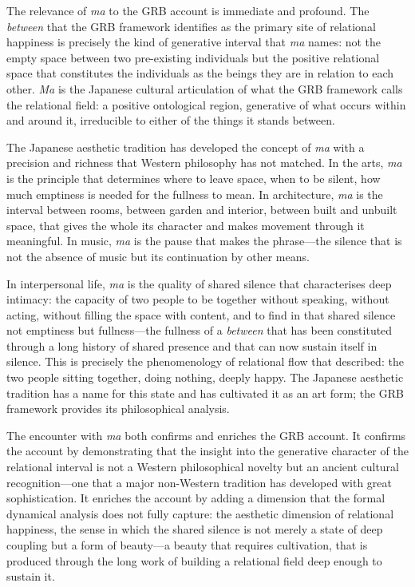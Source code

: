 The relevance of \emph{ma} to the GRB account is immediate and profound. The \emph{between} that the GRB framework identifies as the primary site of relational happiness is precisely the kind of generative interval that \emph{ma} names: not the empty space between two pre-existing individuals but the positive relational space that constitutes the individuals as the beings they are in relation to each other. \emph{Ma} is the Japanese cultural articulation of what the GRB framework calls the relational field: a positive ontological region, generative of what occurs within and around it, irreducible to either of the things it stands between.

The Japanese aesthetic tradition has developed the concept of \emph{ma} with a precision and richness that Western philosophy has not matched. In the arts, \emph{ma} is the principle that determines where to leave space, when to be silent, how much emptiness is needed for the fullness to mean. In architecture, \emph{ma} is the interval between rooms, between garden and interior, between built and unbuilt space, that gives the whole its character and makes movement through it meaningful. In music, \emph{ma} is the pause that makes the phrase---the silence that is not the absence of music but its continuation by other means.

In interpersonal life, \emph{ma} is the quality of shared silence that characterises deep intimacy: the capacity of two people to be together without speaking, without acting, without filling the space with content, and to find in that shared silence not emptiness but fullness---the fullness of a \emph{between} that has been constituted through a long history of shared presence and that can now sustain itself in silence. This is precisely the phenomenology of relational flow that  described: the two people sitting together, doing nothing, deeply happy. The Japanese aesthetic tradition has a name for this state and has cultivated it as an art form; the GRB framework provides its philosophical analysis.

The encounter with \emph{ma} both confirms and enriches the GRB account. It confirms the account by demonstrating that the insight into the generative character of the relational interval is not a Western philosophical novelty but an ancient cultural recognition---one that a major non-Western tradition has developed with great sophistication. It enriches the account by adding a dimension that the formal dynamical analysis does not fully capture: the aesthetic dimension of relational happiness, the sense in which the shared silence is not merely a state of deep coupling but a form of beauty---a beauty that requires cultivation, that is produced through the long work of building a relational field deep enough to sustain it.

